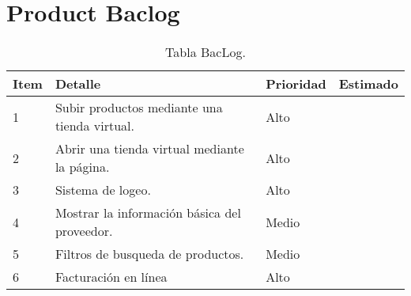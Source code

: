 \chapter{Product Baclog}


\begin{table}[htbp]
	\begin{center}
		\begin{tabular}{|p{2.5cm}|p{6.5cm}|p{2.5cm}|p{3.5cm}|}
			\hline
			Item & Detalle & Prioridad & Estimado\\
			\hline \hline
			1 & Subir productos mediante una tienda virtual. & Alto & \\ \hline
		    2 & Abrir una tienda virtual mediante la página. & Alto & \\ \hline
			3 & Sistema de logeo. & Alto & \\ \hline
			4 & Mostrar la información básica del proveedor. & Medio & \\ \hline
			5 & Filtros de busqueda de productos. & Medio & \\ \hline
			6 & Facturación en línea & Alto & \\ \hline
		\end{tabular}
		\caption{Tabla BacLog.}
		\label{tabla:sencilla}
	\end{center}
\end{table}